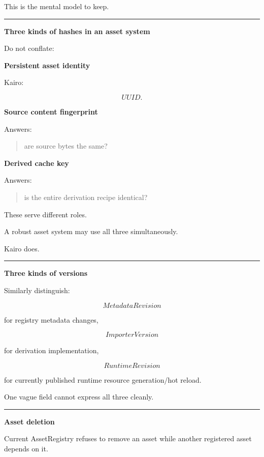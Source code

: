 This is the mental model to keep.

\begin{center}\rule{0.5\linewidth}{0.5pt}\end{center}

\textbf{Three kinds of hashes in an asset system}

Do not conflate:

\textbf{Persistent asset identity}

Kairo:

\[
UUID.
\]

\textbf{Source content fingerprint}

Answers:

\begin{quote}
are source bytes the same?
\end{quote}

\textbf{Derived cache key}

Answers:

\begin{quote}
is the entire derivation recipe identical?
\end{quote}

These serve different roles.

A robust asset system may use all three simultaneously.

Kairo does.

\begin{center}\rule{0.5\linewidth}{0.5pt}\end{center}

\textbf{Three kinds of versions}

Similarly distinguish:

\[
MetadataRevision
\]

for registry metadata changes,

\[
ImporterVersion
\]

for derivation implementation,

\[
RuntimeRevision
\]

for currently published runtime resource generation/hot reload.

One vague  field cannot express all three cleanly.

\begin{center}\rule{0.5\linewidth}{0.5pt}\end{center}

\textbf{Asset deletion}

Current AssetRegistry refuses to remove an asset while another registered asset depends on it.

